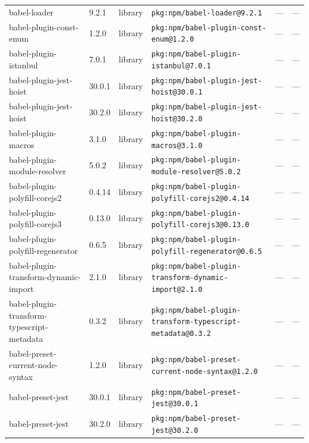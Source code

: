 \documentclass[11pt,a4paper]{article}
\begin{document}
\begin{longtable}{|p{4cm}|p{2cm}|p{1.6cm}|p{5cm}|p{1.5cm}|p{3.5cm}|}
\raggedright babel-loader & 9.2.1 & library & \small\texttt{pkg:npm/babel-loader@9.2.1} & — & \small — \\
\raggedright babel-plugin-const-enum & 1.2.0 & library & \small\texttt{pkg:npm/babel-plugin-const-enum@1.2.0} & — & \small — \\
\raggedright babel-plugin-istanbul & 7.0.1 & library & \small\texttt{pkg:npm/babel-plugin-istanbul@7.0.1} & — & \small — \\
\raggedright babel-plugin-jest-hoist & 30.0.1 & library & \small\texttt{pkg:npm/babel-plugin-jest-hoist@30.0.1} & — & \small — \\
\raggedright babel-plugin-jest-hoist & 30.2.0 & library & \small\texttt{pkg:npm/babel-plugin-jest-hoist@30.2.0} & — & \small — \\
\raggedright babel-plugin-macros & 3.1.0 & library & \small\texttt{pkg:npm/babel-plugin-macros@3.1.0} & — & \small — \\
\raggedright babel-plugin-module-resolver & 5.0.2 & library & \small\texttt{pkg:npm/babel-plugin-module-resolver@5.0.2} & — & \small — \\
\raggedright babel-plugin-polyfill-corejs2 & 0.4.14 & library & \small\texttt{pkg:npm/babel-plugin-polyfill-corejs2@0.4.14} & — & \small — \\
\raggedright babel-plugin-polyfill-corejs3 & 0.13.0 & library & \small\texttt{pkg:npm/babel-plugin-polyfill-corejs3@0.13.0} & — & \small — \\
\raggedright babel-plugin-polyfill-regenerator & 0.6.5 & library & \small\texttt{pkg:npm/babel-plugin-polyfill-regenerator@0.6.5} & — & \small — \\
\raggedright babel-plugin-transform-dynamic-import & 2.1.0 & library & \small\texttt{pkg:npm/babel-plugin-transform-dynamic-import@2.1.0} & — & \small — \\
\raggedright babel-plugin-transform-typescript-metadata & 0.3.2 & library & \small\texttt{pkg:npm/babel-plugin-transform-typescript-metadata@0.3.2} & — & \small — \\
\raggedright babel-preset-current-node-syntax & 1.2.0 & library & \small\texttt{pkg:npm/babel-preset-current-node-syntax@1.2.0} & — & \small — \\
\raggedright babel-preset-jest & 30.0.1 & library & \small\texttt{pkg:npm/babel-preset-jest@30.0.1} & — & \small — \\
\raggedright babel-preset-jest & 30.2.0 & library & \small\texttt{pkg:npm/babel-preset-jest@30.2.0} & — & \small — \\

\end{longtable}
\end{document}
